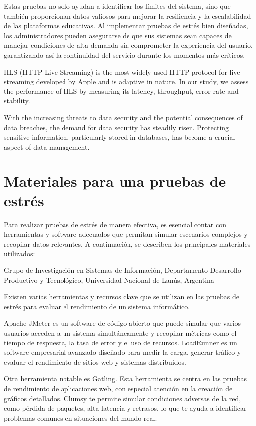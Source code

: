 \documentclass{article}
\begin{document}
Estas pruebas no solo ayudan a identificar los límites del sistema, sino que también proporcionan datos valiosos para mejorar la resiliencia y la escalabilidad de las plataformas educativas. Al implementar pruebas de estrés bien diseñadas, los administradores pueden asegurarse de que sus sistemas sean capaces de manejar condiciones de alta demanda sin comprometer la experiencia del usuario, garantizando así la continuidad del servicio durante los momentos más críticos.


HLS (HTTP Live Streaming) is the most widely used HTTP protocol for live streaming developed by Apple and is adaptive in nature. In our study, we assess the performance of HLS by measuring its latency, throughput, error rate and stability. \parencite{Saini2024}

 With the increasing threats to data security and the potential consequences of data breaches, the demand for data security has steadily risen. Protecting sensitive information, particularly stored in databases, has become a crucial aspect of data management. \parencite{Terencio2023154}

\section{Materiales para una pruebas de estrés}

Para realizar pruebas de estrés de manera efectiva, es esencial contar con herramientas y software adecuados que permitan simular escenarios complejos y recopilar datos relevantes. A continuación, se describen los principales materiales utilizados:

Grupo de Investigación en Sistemas de Información, Departamento Desarrollo Productivo y Tecnológico, Universidad Nacional de Lanús, Argentina \parencite{Caram2012119}


Existen varias herramientas y recursos clave que se utilizan en las pruebas de estrés para evaluar el rendimiento de un sistema informático.

Apache JMeter es un software de código abierto que puede simular que varios usuarios acceden a un sistema simultáneamente y recopilar métricas como el tiempo de respuesta, la tasa de error y el uso de recursos. LoadRunner es un software empresarial avanzado diseñado para medir la carga, generar tráfico y evaluar el rendimiento de sitios web y sistemas distribuidos.

Otra herramienta notable es Gatling. Esta herramienta se centra en las pruebas de rendimiento de aplicaciones web, con especial atención en la creación de gráficos detallados. Clumsy te permite simular condiciones adversas de la red, como pérdida de paquetes, alta latencia y retrasos, lo que te ayuda a identificar problemas comunes en situaciones del mundo real.
\end{document}
